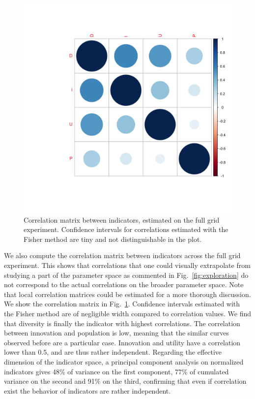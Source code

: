 \documentclass[letterpaper]{article}
\begin{document}
\begin{figure}[t]
	\centering
	\includegraphics[width=\linewidth,trim={6cm 6cm 0 6cm}]{corrmat_indics.png}
	\caption{Correlation matrix between indicators, estimated on the full grid experiment. Confidence intervals for correlations estimated with the Fisher method are tiny and not distinguishable in the plot.\label{fig:cormat}}
\end{figure}


We also compute the correlation matrix between indicators across the full grid experiment. This shows that correlations that one could visually extrapolate from studying a part of the parameter space as commented in Fig.~\ref{fig:exploration} do not correspond to the actual correlations on the broader parameter space. Note that local correlation matrices could be estimated for a more thorough discussion. We show the correlation matrix in Fig.~\ref{fig:cormat}. Confidence intervals estimated with the Fisher method are of negligible width compared to correlation values. We find that diversity is finally the indicator with highest correlations. The correlation between innovation and population is low, meaning that the similar curves observed before are a particular case. Innovation and utility have a correlation lower than 0.5, and are thus rather independent. Regarding the effective dimension of the indicator space, a principal component analysis on normalized indicators gives 48\% of variance on the first component, 77\% of cumulated variance on the second and 91\% on the third, confirming that even if correlation exist the behavior of indicators are rather independent.
\end{document}
